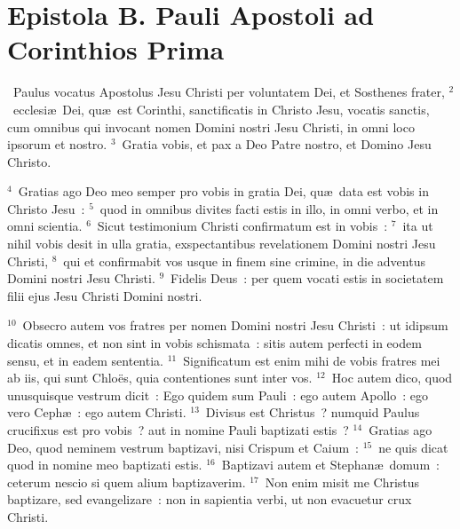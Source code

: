 \clearpage
{\centering \section*{Epistola B. Pauli Apostoli ad Corinthios Prima}}\thispagestyle{empty}

~Paulus vocatus Apostolus Jesu Christi per voluntatem Dei, et Sosthenes frater,
${}^{2}$~ecclesi\ae\ Dei, qu\ae\ est Corinthi, sanctificatis in Christo Jesu, vocatis sanctis, cum omnibus qui invocant nomen Domini nostri Jesu Christi, in omni loco ipsorum et nostro.
${}^{3}$~Gratia vobis, et pax a Deo Patre nostro, et Domino Jesu Christo.


${}^{4}$~Gratias ago Deo meo semper pro vobis in gratia Dei, qu\ae\ data est vobis in Christo Jesu~:
${}^{5}$~quod in omnibus divites facti estis in illo, in omni verbo, et in omni scientia.
${}^{6}$~Sicut testimonium Christi confirmatum est in vobis~:
${}^{7}$~ita ut nihil vobis desit in ulla gratia, exspectantibus revelationem Domini nostri Jesu Christi,
${}^{8}$~qui et confirmabit vos usque in finem sine crimine, in die adventus Domini nostri Jesu Christi.
${}^{9}$~Fidelis Deus~: per quem vocati estis in societatem filii ejus Jesu Christi Domini nostri.


${}^{10}$~Obsecro autem vos fratres per nomen Domini nostri Jesu Christi~: ut idipsum dicatis omnes, et non sint in vobis schismata~: sitis autem perfecti in eodem sensu, et in eadem sententia.
${}^{11}$~Significatum est enim mihi de vobis fratres mei ab iis, qui sunt Chlo\"es, quia contentiones sunt inter vos.
${}^{12}$~Hoc autem dico, quod unusquisque vestrum dicit~: Ego quidem sum Pauli~: ego autem Apollo~: ego vero Ceph\ae~: ego autem Christi.
${}^{13}$~Divisus est Christus~? numquid Paulus crucifixus est pro vobis~? aut in nomine Pauli baptizati estis~?
${}^{14}$~Gratias ago Deo, quod neminem vestrum baptizavi, nisi Crispum et Caium~:
${}^{15}$~ne quis dicat quod in nomine meo baptizati estis.
${}^{16}$~Baptizavi autem et Stephan\ae\ domum~: ceterum nescio si quem alium baptizaverim.
${}^{17}$~Non enim misit me Christus baptizare, sed evangelizare~: non in sapientia verbi, ut non evacuetur crux Christi.


